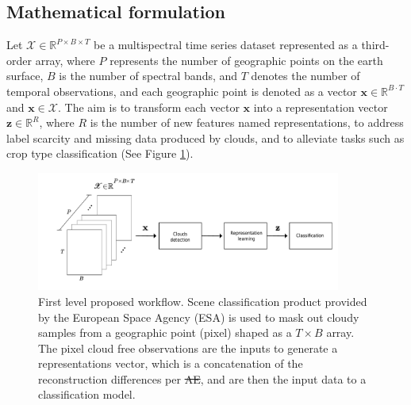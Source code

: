 \documentclass[journal,article,submit,pdftex,moreauthors]{Definitions/mdpi}
\providecommand{\DIFadd}[1]{{\protect\color{blue}\uwave{#1}}} %
\providecommand{\DIFdel}[1]{{\protect\color{red}\sout{#1}}}                      %
\providecommand{\DIFdelbegin}{} %
\providecommand{\DIFaddFL}[1]{\DIFadd{#1}} %
\providecommand{\DIFdelFL}[1]{\DIFdel{#1}} %
\providecommand{\DIFaddbeginFL}{} %
\providecommand{\DIFaddendFL}{} %
\providecommand{\DIFdelbeginFL}{} %
\providecommand{\DIFdelendFL}{} %
\begin{document}
\subsection{Mathematical formulation}
Let $\mathscr{X} \in \mathbb{R}^{P \times B \times T}$ be a multispectral time series dataset represented as a third-order array, where $P$ represents the number of geographic points on the earth surface, $B$ is the number of spectral bands, and $T$ denotes the number of temporal observations, and each geographic point is denoted as a vector $\mathbf{x} \in \mathbb{R}^{B \cdot T}$ and $\mathbf{x} \in \mathscr{X}$. The aim is to transform each vector $\mathbf{x}$ into a representation vector $\mathbf{z} \in \mathbb{R}^{R}$, where $R$ is the number of new features named representations, to address label scarcity and missing data produced by clouds, and to alleviate tasks such as crop type classification (See Figure \ref{bigpicture}).

\DIFdelbegin %
\DIFdelendFL \DIFaddbeginFL \begin{figure}[H]
	\DIFaddendFL \centering
	\includegraphics[width=10cm]{figures/bigpicture_with_clement.pdf}
	\caption{First level proposed workflow. Scene classification product provided by the European Space Agency (ESA) is used to mask out cloudy samples from a geographic point (pixel) shaped as a $T \times B$ array. The pixel cloud free observations are the inputs to generate a representations vector, which is a concatenation of the reconstruction differences per \DIFdelbeginFL \DIFdelFL{AE}\DIFdelendFL \DIFaddbeginFL \DIFaddFL{autoencoder}\DIFaddendFL , and are then the input data to a classification model.}
	\label{bigpicture}
	\centering
\end{figure}
\end{document}
